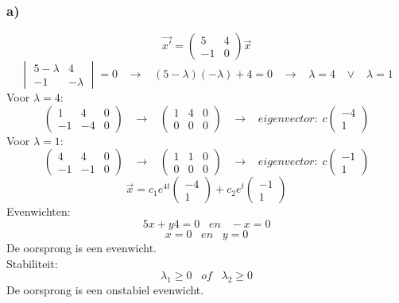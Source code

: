 \documentclass[11pt]{article}
\begin{document}
\subsubsection*{a)}
\[
\vec{x'} = 
\begin{pmatrix}
5 & 4\\
-1 & 0
\end{pmatrix}
\vec{x}
\]
\[
\begin{vmatrix}
5-\lambda & 4 \\
-1 & -\lambda
\end{vmatrix}
=0
\;\;\;\longrightarrow\;\;\;
(5-\lambda)(-\lambda)+4=0
\;\;\;\longrightarrow\;\;\;
\lambda = 4 \;\;\;\vee\;\;\;\lambda = 1
\]
Voor $\lambda = 4$: 
\[
\left(
\begin{array}{cc|c}
1 & 4 & 0 \\
-1 & -4 & 0
\end{array}
\right)
\;\;\;\longrightarrow\;\;\;
\left(
\begin{array}{cc|c}
1 & 4 & 0 \\
0 & 0 & 0
\end{array}
\right)
\;\;\;\longrightarrow\;\;\;
eigenvector:\;
c
\begin{pmatrix}
-4\\1
\end{pmatrix}
\]
Voor $\lambda = 1$: 
\[
\left(
\begin{array}{cc|c}
4 & 4 & 0 \\
-1 & -1 & 0
\end{array}
\right)
\;\;\;\longrightarrow\;\;\;
\left(
\begin{array}{cc|c}
1 & 1 & 0 \\
0 & 0 & 0
\end{array}
\right)
\;\;\;\longrightarrow\;\;\;
eigenvector:\;
c
\begin{pmatrix}
-1\\1
\end{pmatrix}
\]
\[
\vec{x} = c_1e^{4t}\begin{pmatrix}
-4\\1
\end{pmatrix}+c_2e^{t}\begin{pmatrix}
-1\\1
\end{pmatrix}
\]
Evenwichten:
\[
5x+y4=0 \;\;\;en\;\;\; -x=0
\]
\[
x=0 \;\;\;en\;\;\; y=0
\]
De oorsprong is een evenwicht.\\
Stabiliteit:
\[
\lambda_1 \ge 0 \;\;\;of\;\;\; \lambda_2 \ge 0
\]
De oorsprong is een onstabiel evenwicht.
\end{document}
